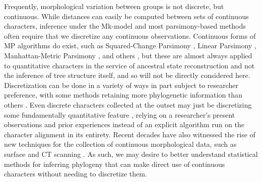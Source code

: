 Frequently, morphological variation between groups is not discrete, but continuous. While distances can easily be computed between sets of continuous characters, inference under the Mk-model \citep{lewisLikelihoodApproachEstimating2001} and most parsimony-based methods \citep{goloboffContinuousCharactersAnalyzed2006} often require that we discretize any continuous observations. Continuous forms of MP algorithms do exist, such as Squared-Change Parsimony \citep{maddisonSquaredchangeParsimonyReconstructions1991, rohlfGeometricMorphometricsPhylogeny2002}, Linear Parsimony \citep{klugeQuantitativePhyleticsEvolution1969}, Manhattan-Metric Parsimony \citep{swoffordInferringEvolutionaryTrees1987}, and others \citep[see][]{rogersComparisonSuitabilityRogers1991}, but these are almost always applied to quantitative characters in the service of ancestral state reconstruction and not the inference of tree structure itself, and so will not be directly considered here. Discretization can be done in a variety of ways \citep{garcia-cruzCodingQuantitativeCharacter2006, thorpeCodingMorphometricCharacters1984} in part subject to researcher preference, with some methods retaining more phylogenetic information than others \citep{brazeauProblematicCharacterCoding2011, worthingtonSelectionCharacterCoding2017}. Even discrete characters collected at the outset may just be discretizing some fundamentally quantitative feature \citep{wiensCharacterAnalysisMorphological2001}, relying on a researcher's present observations and prior experiences instead of an explicit algorithm run on the character alignment in its entirety. Recent decades have also witnessed the rise of new techniques for the collection of continuous morphological data, such as surface and CT scanning \citep{mitteroeckerAdvancesGeometricMorphometrics2009, adamsFieldComesAge2013, reinGeometricMorphometricsVirtual2014}. As such, we may desire to better understand statistical methods for inferring phylogeny that can make direct use of continuous characters without needing to discretize them. 


